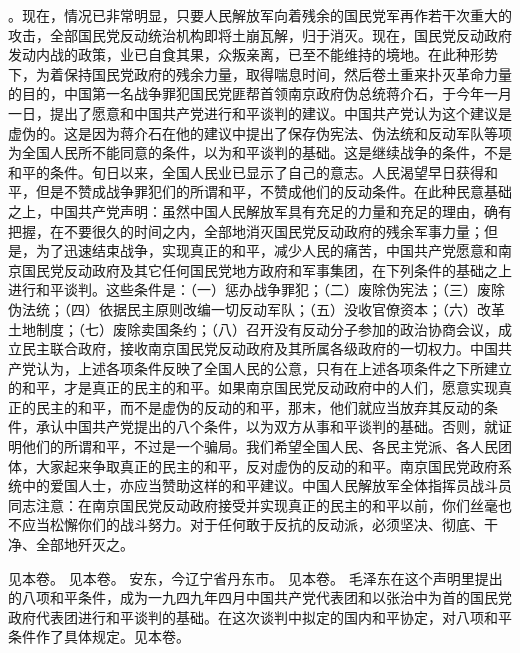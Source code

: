 。现在，情况已非常明显，只要人民解放军向着残余的国民党军再作若干次重大的攻击，全部国民党反动统治机构即将土崩瓦解，归于消灭。现在，国民党反动政府发动内战的政策，业已自食其果，众叛亲离，已至不能维持的境地。在此种形势下，为着保持国民党政府的残余力量，取得喘息时间，然后卷土重来扑灭革命力量的目的，中国第一名战争罪犯国民党匪帮首领南京政府伪总统蒋介石，于今年一月一日，提出了愿意和中国共产党进行和平谈判的建议。中国共产党认为这个建议是虚伪的。这是因为蒋介石在他的建议中提出了保存伪宪法、伪法统和反动军队等项为全国人民所不能同意的条件，以为和平谈判的基础。这是继续战争的条件，不是和平的条件。旬日以来，全国人民业已显示了自己的意志。人民渴望早日获得和平，但是不赞成战争罪犯们的所谓和平，不赞成他们的反动条件。在此种民意基础之上，中国共产党声明：虽然中国人民解放军具有充足的力量和充足的理由，确有把握，在不要很久的时间之内，全部地消灭国民党反动政府的残余军事力量；但是，为了迅速结束战争，实现真正的和平，减少人民的痛苦，中国共产党愿意和南京国民党反动政府及其它任何国民党地方政府和军事集团，在下列条件的基础之上进行和平谈判。这些条件是：（一）惩办战争罪犯；（二）废除伪宪法；（三）废除伪法统；（四）依据民主原则改编一切反动军队；（五）没收官僚资本；（六）改革土地制度；（七）废除卖国条约；（八）召开没有反动分子参加的政治协商会议，成立民主联合政府，接收南京国民党反动政府及其所属各级政府的一切权力。中国共产党认为，上述各项条件反映了全国人民的公意，只有在上述各项条件之下所建立的和平，才是真正的民主的和平。如果南京国民党反动政府中的人们，愿意实现真正的民主的和平，而不是虚伪的反动的和平，那末，他们就应当放弃其反动的条件，承认中国共产党提出的八个条件，以为双方从事和平谈判的基础。否则，就证明他们的所谓和平，不过是一个骗局。我们希望全国人民、各民主党派、各人民团体，大家起来争取真正的民主的和平，反对虚伪的反动的和平。南京国民党政府系统中的爱国人士，亦应当赞助这样的和平建议。中国人民解放军全体指挥员战斗员同志注意：在南京国民党反动政府接受并实现真正的民主的和平以前，你们丝毫也不应当松懈你们的战斗努力。对于任何敢于反抗的反动派，必须坚决、彻底、干净、全部地歼灭之。


\begin{maonote}
见本卷。
见本卷。
安东，今辽宁省丹东市。
见本卷。
毛泽东在这个声明里提出的八项和平条件，成为一九四九年四月中国共产党代表团和以张治中为首的国民党政府代表团进行和平谈判的基础。在这次谈判中拟定的国内和平协定，对八项和平条件作了具体规定。见本卷。
\end{maonote}
